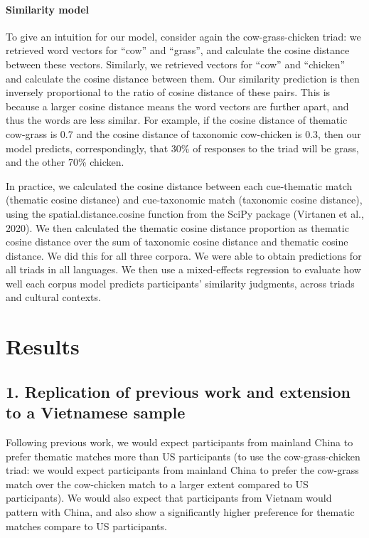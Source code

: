 \documentclass[10pt, letterpaper]{article}
\begin{document}
\hypertarget{similarity-model}{%
\paragraph{Similarity model}\label{similarity-model}}

To give an intuition for our model, consider again the cow-grass-chicken
triad: we retrieved word vectors for ``cow'' and ``grass'', and
calculate the cosine distance between these vectors. Similarly, we
retrieved vectors for ``cow'' and ``chicken'' and calculate the cosine
distance between them. Our similarity prediction is then inversely
proportional to the ratio of cosine distance of these pairs. This is
because a larger cosine distance means the word vectors are further
apart, and thus the words are less similar. For example, if the cosine
distance of thematic cow-grass is 0.7 and the cosine distance of
taxonomic cow-chicken is 0.3, then our model predicts, correspondingly,
that 30\% of responses to the triad will be grass, and the other 70\%
chicken.

In practice, we calculated the cosine distance between each cue-thematic
match (thematic cosine distance) and cue-taxonomic match (taxonomic
cosine distance), using the spatial.distance.cosine function from the
SciPy package (Virtanen et al., 2020). We then calculated the thematic
cosine distance proportion as thematic cosine distance over the sum of
taxonomic cosine distance and thematic cosine distance. We did this for
all three corpora. We were able to obtain predictions for all triads in
all languages. We then use a mixed-effects regression to evaluate how
well each corpus model predicts participants' similarity judgments,
across triads and cultural contexts.

\hypertarget{results}{%
\section{Results}\label{results}}

\hypertarget{replication-of-previous-work-and-extension-to-a-vietnamese-sample}{%
\subsection{1. Replication of previous work and extension to a
Vietnamese
sample}\label{replication-of-previous-work-and-extension-to-a-vietnamese-sample}}

Following previous work, we would expect participants from mainland
China to prefer thematic matches more than US participants (to use the
cow-grass-chicken triad: we would expect participants from mainland
China to prefer the cow-grass match over the cow-chicken match to a
larger extent compared to US participants). We would also expect that
participants from Vietnam would pattern with China, and also show a
significantly higher preference for thematic matches compare to US
participants.
\end{document}
